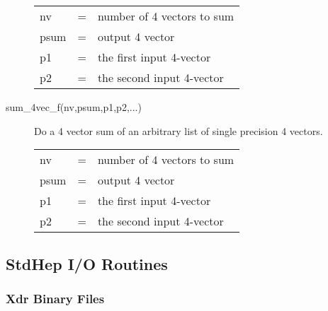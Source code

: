 \begin{description}
\begin{tabular}{lcl}
nv   & = & number of 4 vectors to sum \\
psum & = & output 4 vector \\
p1   & = & the first input 4-vector \\
p2   & = & the second input 4-vector \\
\end{tabular}

\item[sum\_4vec\_f(nv,psum,p1,p2,...)] 
 Do a 4 vector sum of an arbitrary list of single precision 4 vectors.

\begin{tabular}{lcl}
nv   & = & number of 4 vectors to sum \\
psum & = & output 4 vector \\
p1   & = & the first input 4-vector \\
p2   & = & the second input 4-vector \\
\end{tabular}

\end{description}


\subsection{StdHep I/O Routines}

\subsubsection{Xdr Binary Files}

